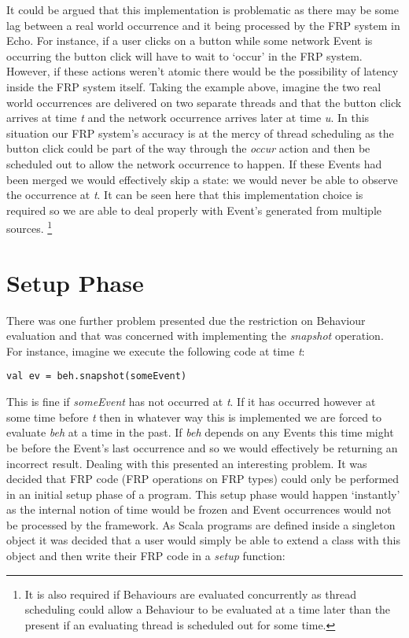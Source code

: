      It could be argued that this implementation is problematic as there may be some lag between a real world
     occurrence and it being processed by the FRP system in Echo. For instance, if a user clicks on a button
     while some network Event is occurring the button click will have to wait to `occur' in the FRP system.
     However, if these actions weren't atomic there would be the possibility of latency inside the FRP
     system itself. Taking the example above, imagine the two real world occurrences are delivered on two
     separate threads and that the button click arrives at time \emph{t} and the network occurrence
     arrives later at time \emph{u}. In this
     situation our FRP system's accuracy is at the mercy of thread scheduling as the button click
     could be part of the way through the \emph{occur} action and then be scheduled out to allow the network
     occurrence to happen. If these Events had been merged we would effectively skip a state:
     we would never be able to observe the occurrence at \emph{t}. It can be seen here that this implementation
     choice is required so we are able to deal properly with Event's generated from multiple sources. 
     \footnote{It is also required if Behaviours are evaluated concurrently as thread scheduling could
     allow a Behaviour to be evaluated at a time later than the present if an evaluating thread is
     scheduled out for some time.}
  
    \section{Setup Phase}
      There was one further problem presented due the restriction on Behaviour evaluation and that was concerned with
      implementing the \emph{snapshot} operation. For instance, imagine we execute the following code
      at time \emph{t}:

\begin{verbatim}
val ev = beh.snapshot(someEvent)
\end{verbatim}

      This is fine if \emph{someEvent} has not occurred at \emph{t}. If it has occurred however at some time
      before \emph{t} then in whatever way this is implemented we are forced to evaluate \emph{beh}
      at a time in the past. If \emph{beh} depends on any Events this time might be before the Event's
      last occurrence and so we would effectively be returning an incorrect result. Dealing with this
      presented an interesting problem. It was decided that FRP
      code (FRP operations on FRP types) could only be performed in an initial setup phase of a program.
      This setup phase would happen `instantly' as the internal notion of time would be frozen and Event
      occurrences would not be processed by the framework. As Scala programs are defined inside a singleton
      object it was decided that a user would simply be able to extend a class with this object and then
      write their FRP code in a \emph{setup} function:

